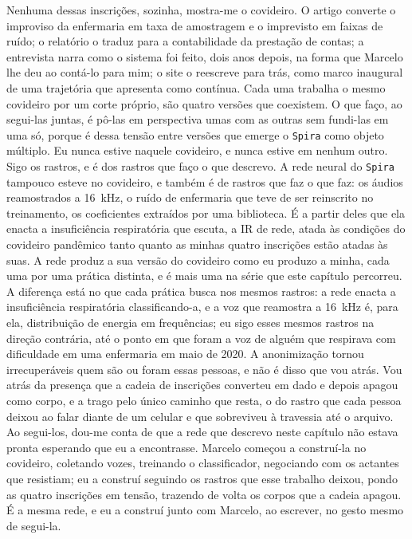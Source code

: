 Nenhuma dessas inscrições, sozinha, mostra-me o covideiro. O artigo converte o improviso da enfermaria em taxa de amostragem e o imprevisto em faixas de ruído; o relatório o traduz para a contabilidade da prestação de contas; a entrevista narra como o sistema foi feito, dois anos depois, na forma que Marcelo lhe deu ao contá-lo para mim; o site o reescreve para trás, como marco inaugural de uma trajetória que apresenta como contínua. Cada uma trabalha o mesmo covideiro por um corte próprio, são quatro versões que coexistem. O que faço, ao segui-las juntas, é pô-las em perspectiva umas com as outras sem fundi-las em uma só, porque é dessa tensão entre versões que emerge o \texttt{Spira} como objeto múltiplo. Eu nunca estive naquele covideiro, e nunca estive em nenhum outro. Sigo os rastros, e é dos rastros que faço o que descrevo. A rede neural do \texttt{Spira} tampouco esteve no covideiro, e também é de rastros que faz o que faz: os áudios reamostrados a 16~kHz, o ruído de enfermaria que teve de ser reinscrito no treinamento, os coeficientes extraídos por uma biblioteca. É a partir deles que ela enacta a insuficiência respiratória que escuta, a IR de rede, atada às condições do covideiro pandêmico tanto quanto as minhas quatro inscrições estão atadas às suas. A rede produz a sua versão do covideiro como eu produzo a minha, cada uma por uma prática distinta, e é mais uma na série que este capítulo percorreu. A diferença está no que cada prática busca nos mesmos rastros: a rede enacta a insuficiência respiratória classificando-a, e a voz que reamostra a 16~kHz é, para ela, distribuição de energia em frequências; eu sigo esses mesmos rastros na direção contrária, até o ponto em que foram a voz de alguém que respirava com dificuldade em uma enfermaria em maio de 2020. A anonimização tornou irrecuperáveis quem são ou foram essas pessoas, e não é disso que vou atrás. Vou atrás da presença que a cadeia de inscrições converteu em dado e depois apagou como corpo, e a trago pelo único caminho que resta, o do rastro que cada pessoa deixou ao falar diante de um celular e que sobreviveu à travessia até o arquivo. Ao segui-los, dou-me conta de que a rede que descrevo neste capítulo não estava pronta esperando que eu a encontrasse. Marcelo começou a construí-la no covideiro, coletando vozes, treinando o classificador, negociando com os actantes que resistiam; eu a construí seguindo os rastros que esse trabalho deixou, pondo as quatro inscrições em tensão, trazendo de volta os corpos que a cadeia apagou. É a mesma rede, e eu a construí junto com Marcelo, ao escrever, no gesto mesmo de segui-la.


